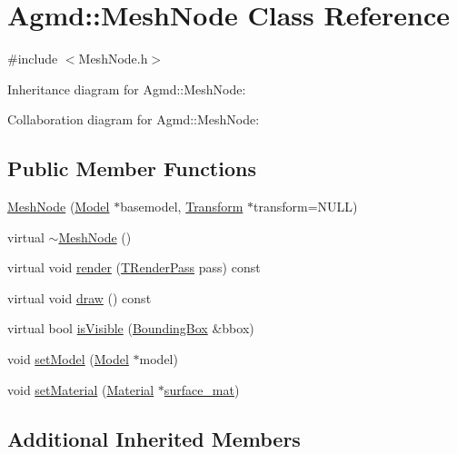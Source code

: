 \hypertarget{class_agmd_1_1_mesh_node}{\section{Agmd\+:\+:Mesh\+Node Class Reference}
\label{class_agmd_1_1_mesh_node}
}


{\ttfamily \#include $<$Mesh\+Node.\+h$>$}



Inheritance diagram for Agmd\+:\+:Mesh\+Node\+:


Collaboration diagram for Agmd\+:\+:Mesh\+Node\+:
\subsection*{Public Member Functions}
\begin{DoxyCompactItemize}
\item 
\hyperlink{class_agmd_1_1_mesh_node_a3fe4461842909318d97330caf3f711f1}{Mesh\+Node} (\hyperlink{class_agmd_1_1_model}{Model} $\ast$basemodel, \hyperlink{class_agmd_maths_1_1_transform}{Transform} $\ast$transform=N\+U\+L\+L)
\item 
virtual \hyperlink{class_agmd_1_1_mesh_node_aa0d4cfbb37610bab4aa7fe3f787be73e}{$\sim$\+Mesh\+Node} ()
\item 
virtual void \hyperlink{class_agmd_1_1_mesh_node_a4152144e5d07304bb44001a5e97571a5}{render} (\hyperlink{namespace_agmd_a893087981df53d0bf39466e9039aeb73}{T\+Render\+Pass} pass) const 
\item 
virtual void \hyperlink{class_agmd_1_1_mesh_node_a8b905212c90d73b820531b36ea9bb0a9}{draw} () const 
\item 
virtual bool \hyperlink{class_agmd_1_1_mesh_node_afdb179841c3cd851b2288a48dfb691f8}{is\+Visible} (\hyperlink{class_agmd_1_1_bounding_box}{Bounding\+Box} \&bbox)
\item 
void \hyperlink{class_agmd_1_1_mesh_node_a8de6dd045d3cd0d257921351545cdd65}{set\+Model} (\hyperlink{class_agmd_1_1_model}{Model} $\ast$model)
\item 
void \hyperlink{class_agmd_1_1_mesh_node_a82fb33982608eac2d8da479a70ea888d}{set\+Material} (\hyperlink{class_agmd_1_1_material}{Material} $\ast$\hyperlink{_examples_2_bezier_2_app_8cpp_a63e99cfa720724b1887a463ec6abd935}{surface\+\_\+mat})
\end{DoxyCompactItemize}
\subsection*{Additional Inherited Members}



